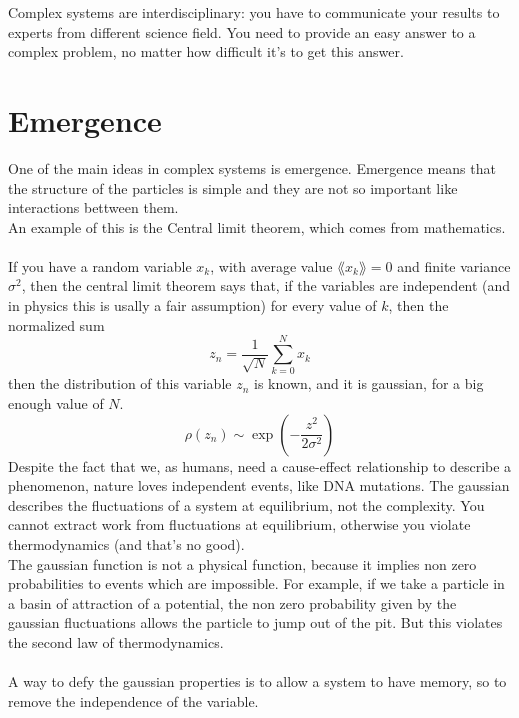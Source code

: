 Complex systems are interdisciplinary: you have to communicate your results to experts from different science field.
You need to provide an easy answer to a complex problem, no matter how difficult it's to get this answer.

\section{Emergence}
One of the main ideas in complex systems is emergence. Emergence means that the structure of the particles is simple and they are not so important like interactions bettween them. \\
An example of this is the Central limit theorem, which comes from mathematics. \\ \\
If you have a random variable $x_k$, with average value $\lang x_k \rang = 0$ and finite variance $\sigma^2$, then the central limit theorem says that, if the variables are independent (and in physics this is usally a fair assumption) for every value of $k$, then the normalized sum 
$$
	z_n = \frac{1}{\sqrt{N}}\sum_{k=0}^N x_k
$$
then the distribution of this variable $z_n$ is known, and it is gaussian, for a big enough value of $N$.
$$
	\rho(z_n) \sim \exp\left(-\frac{z^2}{2\sigma^2}\right)
$$
Despite the fact that we, as humans, need a cause-effect relationship to describe a phenomenon, nature loves independent events, like DNA mutations.
The gaussian describes the fluctuations of a system at equilibrium, not the complexity. You cannot extract work from fluctuations at equilibrium, otherwise you violate thermodynamics (and that's no good). \\
The gaussian function is not a physical function, because it implies non zero probabilities to events which are impossible. For example, if we take a particle in a basin of attraction of a potential, the non zero probability given by the gaussian fluctuations allows the particle to jump out of the pit. But this violates the second law of thermodynamics. \\ \\
A way to defy the gaussian properties is to allow a system to have memory, so to remove the independence of the variable. 

